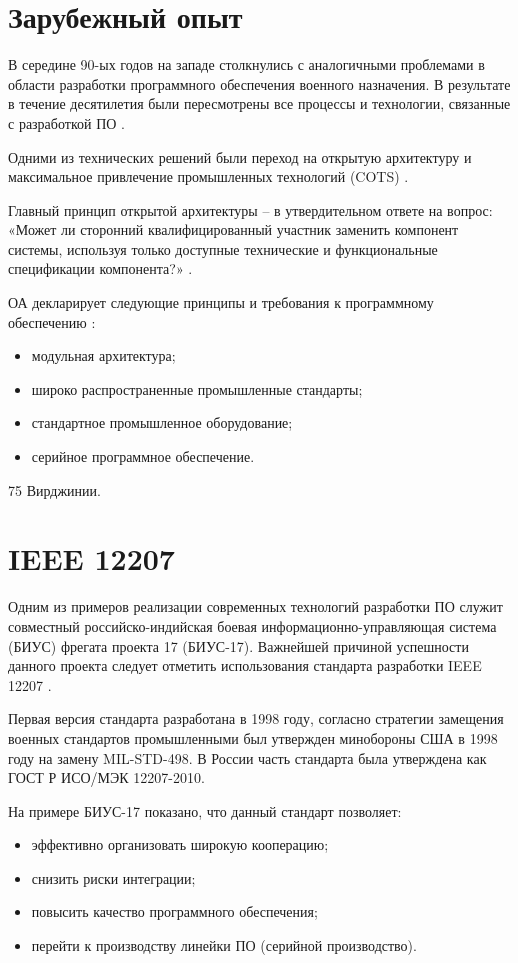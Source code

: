 \documentclass[paper=a4, fontsize=12pt, titlepage=false, twoside=false]{scrartcl}
\begin{document}
\section{Зарубежный опыт}

В середине 90-ых годов на западе столкнулись с аналогичными проблемами в области
разработки программного обеспечения военного назначения.
В результате в течение десятилетия были пересмотрены все процессы и технологии,
связанные с разработкой ПО \cite{report94,report98,report00}.

Одними из технических решений были переход на открытую архитектуру
\cite{report98,guidesis,oanaval} и максимальное
привлечение промышленных технологий (COTS) \cite{cots}.

Главный принцип открытой архитектуры -- в утвердительном ответе на
вопрос: «Может ли сторонний квалифицированный участник заменить
компонент системы, используя только доступные технические и
функциональные спецификации компонента?» \cite{ibmoa}.

ОА декларирует следующие принципы и требования к программному обеспечению
\cite{oanaval,ibmoa}:
\begin{itemize}
  \item модульная архитектура;
  \item широко распространенные промышленные стандарты;
  \item стандартное промышленное оборудование;
  \item серийное программное обеспечение.
\end{itemize}

75 Вирджинии.

\section{IEEE 12207}

Одним из примеров реализации современных технологий разработки
ПО служит совместный российско-индийская
боевая информационно-управляющая система (БИУС) фрегата проекта 17 (БИУС-17).
Важнейшей причиной успешности данного проекта следует отметить
использования стандарта разработки IEEE 12207 \cite{ieee12207}.

Первая версия стандарта разработана в 1998 году, согласно стратегии
замещения военных стандартов промышленными \cite{perry,report94} был
утвержден минобороны США в 1998 году на замену MIL-STD-498. В России
часть стандарта была утверждена как ГОСТ Р ИСО/МЭК 12207-2010.

На примере БИУС-17 показано, что данный стандарт позволяет:
\begin{itemize}
  \item эффективно организовать широкую кооперацию;
  \item снизить риски интеграции;
  \item повысить качество программного обеспечения;
  \item перейти к производству линейки ПО (серийной производство).
\end{itemize}
\end{document}
